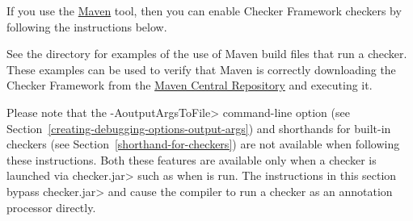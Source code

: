 


If you use the \href{http://maven.apache.org/}{Maven} tool,
then you can enable Checker Framework checkers by following the
instructions below.

See the directory  for examples of the use of
Maven build files that run a checker.  These examples can be used to verify that
Maven is correctly downloading the Checker Framework from the
\href{https://search.maven.org/search?q=org.checkerframework}{Maven
  Central Repository} and executing it.

Please note that the \<-AoutputArgsToFile> command-line option
(see Section~\ref{creating-debugging-options-output-args}) and shorthands for built-in checkers
(see Section~\ref{shorthand-for-checkers}) are not available when
following these instructions.  Both these features are available only when a checker is
launched via \<checker.jar> such as when 
is run.  The instructions in this section
bypass \<checker.jar> and cause the compiler to run a
checker as an annotation processor directly.

